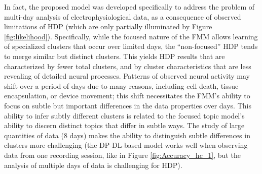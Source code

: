 \documentclass[journal]{IEEEtran}
\begin{document}
In fact, the proposed model was developed specifically to address the problem of multi-day  analysis of electrophysiological data, as a consequence of observed limitations of HDP (which are only partially illuminated by Figure \ref{fig:likelihood}). Specifically, while the focused nature of the FMM allows learning of specialized clusters that occur over limited days, the ``non-focused'' HDP tends to merge similar but distinct clusters. This yields HDP results that are characterized by fewer total clusters, and by cluster characteristics that are less revealing of detailed neural processes. Patterns of observed neural activity may shift over a period of days due to many reasons, including cell death, tissue encapsulation, or device movement; this shift necessitates the FMM's ability to focus on subtle but important differences in the data properties over days. This ability to infer subtly different clusters is related to the focused topic model's ability  \cite{compound} to discern distinct topics that differ in subtle ways. The study of large quantities of data (8 days) makes the ability to distinguish subtle differences in clusters more challenging (the DP-DL-based model works well when observing data from one recording session, like in Figure \ref{fig:Accuracy_hc_1}, but the analysis of multiple days of data is challenging for HDP).
\end{document}
